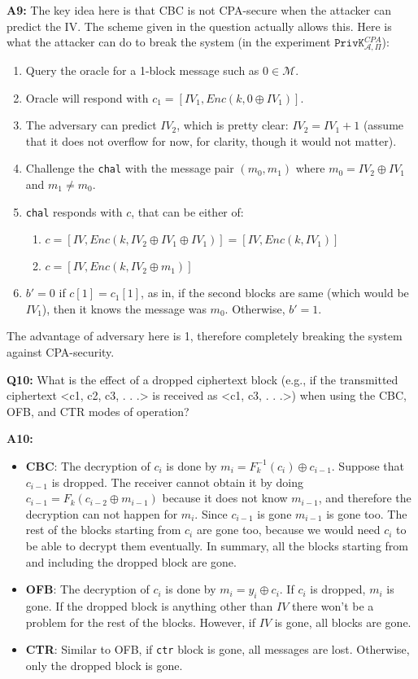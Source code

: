 \documentclass[12pt,reqno]{amsart}
\newcommand{\code}[1]{\texttt{#1}}
\newcommand{\msgspc}[0]{\mathcal{M}}
\newcommand{\advrs}[0]{\mathcal{A}}
\begin{document}
\textbf{A9:} The key idea here is that CBC is not CPA-secure when the attacker can predict the IV. The scheme given in the question actually allows this. Here is what the attacker can do to break the system (in the experiment $\code{PrivK}_{\advrs,\Pi}^{CPA}$):
\begin{enumerate}
	\item Query the oracle for a 1-block message such as $0 \in \msgspc$.
	\item Oracle will respond with $c_1=[IV_1, Enc(k, 0 \oplus IV_1)]$.
	\item The adversary can predict $IV_2$, which is pretty clear: $IV_2=IV_1 + 1$ (assume that it does not overflow for now, for clarity, though it would not matter).
	\item Challenge the \code{chal} with the message pair $(m_0,m_1)$ where $m_0=IV_2\oplus IV_1$ and $m_1\ne m_0$.
	\item \code{chal} responds with $c$, that can be either of:
	\begin{enumerate}
		\item $c = [IV, Enc(k, IV_2\oplus IV_1\oplus IV_1)] =  [IV, Enc(k, IV_1)]$
		\item $c = [IV, Enc(k, IV_2\oplus m_1)]$
	\end{enumerate}	
	\item $b'=0$ if $c[1]=c_1[1]$, as in, if the second blocks are same (which would be $IV_1$), then it knows the message was $m_0$. Otherwise, $b'=1$.
\end{enumerate}
The advantage of adversary here is 1, therefore completely breaking the system against CPA-security.

\vspace{20px}
\textbf{Q10:} What is the effect of a dropped ciphertext block (e.g., if the transmitted ciphertext <c1, c2, c3, . . .> is received as <c1, c3, . . .>) when using the CBC, OFB, and CTR modes of operation?

\textbf{A10:} 
\begin{itemize}
	\item \textbf{CBC}: The decryption of $c_i$ is done by $m_i=F_k^{-1}(c_i) \oplus c_{i-1}$. Suppose that $c_{i-1}$ is dropped. The receiver cannot obtain it by doing $c_{i-1}=F_k(c_{i-2}\oplus m_{i-1})$ because it does not know $m_{i-1}$, and therefore the decryption can not happen for $m_i$. Since $c_{i-1}$ is gone $m_{i-1}$ is gone too. The rest of the blocks starting from $c_i$ are gone too, because we would need $c_i$ to be able to decrypt them eventually. In summary, all the blocks starting from and including the dropped block are gone.
	\item \textbf{OFB}: The decryption of $c_i$ is done by $m_i=y_i \oplus c_i$. If $c_i$ is dropped, $m_i$ is gone. If the dropped block is anything other than $IV$ there won't be a problem for the rest of the blocks. However, if $IV$ is gone, all blocks are gone.
	\item \textbf{CTR}: Similar to OFB, if \code{ctr} block is gone, all messages are lost. Otherwise, only the dropped block is gone.
\end{itemize}
\end{document}
